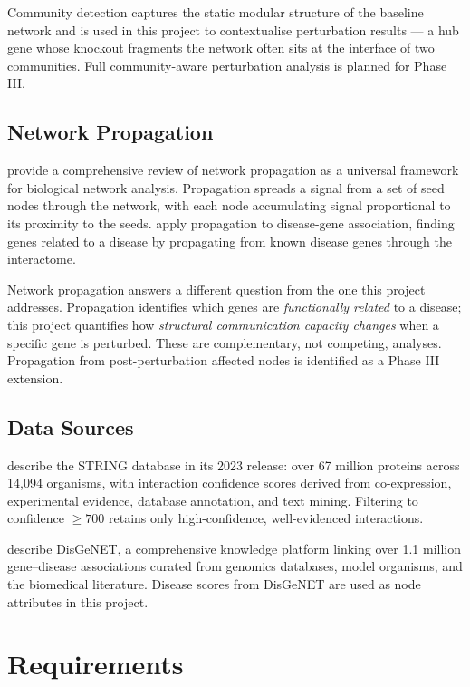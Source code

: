\documentclass[12pt,a4paper]{report}
\begin{document}
Community detection captures the static modular structure of the baseline network and is used in this project to contextualise perturbation results — a hub gene whose knockout fragments the network often sits at the interface of two communities. Full community-aware perturbation analysis is planned for Phase III.

\section{Network Propagation}

\citet{cowen2017network} provide a comprehensive review of network propagation as a universal framework for biological network analysis. Propagation spreads a signal from a set of seed nodes through the network, with each node accumulating signal proportional to its proximity to the seeds. \citet{vanunu2010associating} apply propagation to disease-gene association, finding genes related to a disease by propagating from known disease genes through the interactome.

Network propagation answers a different question from the one this project addresses. Propagation identifies which genes are \textit{functionally related} to a disease; this project quantifies how \textit{structural communication capacity changes} when a specific gene is perturbed. These are complementary, not competing, analyses. Propagation from post-perturbation affected nodes is identified as a Phase III extension.

\section{Data Sources}

\citet{szklarczyk2023string} describe the STRING database in its 2023 release: over 67 million proteins across 14{,}094 organisms, with interaction confidence scores derived from co-expression, experimental evidence, database annotation, and text mining. Filtering to confidence $\geq 700$ retains only high-confidence, well-evidenced interactions.

\citet{pinero2020disgenet} describe DisGeNET, a comprehensive knowledge platform linking over 1.1 million gene–disease associations curated from genomics databases, model organisms, and the biomedical literature. Disease scores from DisGeNET are used as node attributes in this project.

\chapter{Requirements}
\end{document}
